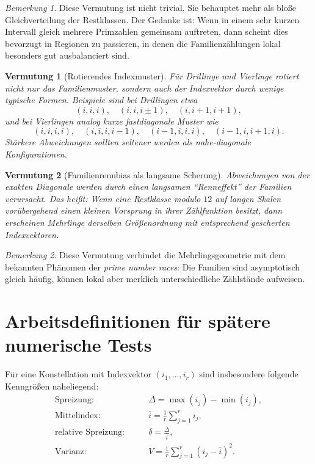 \documentclass[11pt,a4paper]{article}
\theoremstyle{plain}
\newtheorem{vermutung}{Vermutung}
\theoremstyle{definition}
\theoremstyle{remark}
\newtheorem{bemerkung}{Bemerkung}
\begin{document}
\begin{bemerkung}
Diese Vermutung ist nicht trivial. Sie behauptet mehr als bloße Gleichverteilung der Restklassen. Der Gedanke ist: Wenn in einem sehr kurzen Intervall gleich mehrere Primzahlen gemeinsam auftreten, dann scheint dies bevorzugt in Regionen zu passieren, in denen die Familienzählungen lokal besonders gut ausbalanciert sind.
\end{bemerkung}

\begin{vermutung}[Rotierendes Indexmuster]
Für Drillinge und Vierlinge rotiert nicht nur das Familienmuster, sondern auch der Indexvektor durch wenige typische Formen. Beispiele sind bei Drillingen etwa
\[
(i,i,i),\quad (i,i,i\pm 1),\quad (i,i+1,i+1),
\]
und bei Vierlingen analog kurze fastdiagonale Muster wie
\[
(i,i,i,i),\quad (i,i,i,i-1),\quad (i-1,i,i,i),\quad (i-1,i,i+1,i).
\]
Stärkere Abweichungen sollten seltener werden als nahe-diagonale Konfigurationen.
\end{vermutung}

\begin{vermutung}[Familienrennbias als langsame Scherung]
Abweichungen von der exakten Diagonale werden durch einen langsamen ``Renneffekt'' der Familien verursacht. Das heißt: Wenn eine Restklasse modulo $12$ auf langen Skalen vorübergehend einen kleinen Vorsprung in ihrer Zählfunktion besitzt, dann erscheinen Mehrlinge derselben Größenordnung mit entsprechend gescherten Indexvektoren.
\end{vermutung}

\begin{bemerkung}
Diese Vermutung verbindet die Mehrlingsgeometrie mit dem bekannten Phänomen der \emph{prime number races}: Die Familien sind asymptotisch gleich häufig, können lokal aber merklich unterschiedliche Zählstände aufweisen.
\end{bemerkung}

\section{Arbeitsdefinitionen für spätere numerische Tests}

Für eine Konstellation mit Indexvektor $(i_1,\dots,i_r)$ sind insbesondere folgende Kenngrößen naheliegend:
\begin{align*}
\text{Spreizung:}\qquad &\Delta = \max(i_j)-\min(i_j),\\
\text{Mittelindex:}\qquad &\bar{i}=\frac{1}{r}\sum_{j=1}^r i_j,\\
\text{relative Spreizung:}\qquad &\delta = \frac{\Delta}{\bar{i}},\\
\text{Varianz:}\qquad &V = \frac{1}{r}\sum_{j=1}^r (i_j-\bar{i})^2.
\end{align*}
\end{document}
